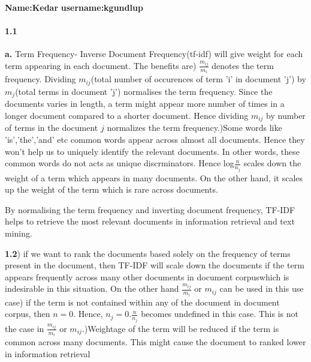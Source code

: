 \documentclass{article}
\begin{document}
\textbf{Name:Kedar}\newline
\textbf{username:kgundlup}\newline
\paragraph{1.1}
\textbf{a.}
Term Frequency- Inverse Document Frequency(tf-idf) will give weight for each term appearing in each document. The benefits are) $\frac{m_{ij}}{m_{i}}$ denotes the term frequency. Dividing $m_{ij}$(total number of occurences of term 'i' in document 'j') by $m_{j}$(total terms in document 'j') normalises the term frequency. Since the documents varies in length, a term might appear more number of times in a longer document compared to a shorter document. Hence dividing $m_{ij}$ by number of terms in the document ${j}$ normalizes the term frequency.)Some words like 'is','the','and' etc common words appear across almost all documents. Hence they won't help us to uniquely identify the relevant documents. In other words, these common words do not acts as unique discrminators. Hence log$\frac{n}{n_{j}}$ scales down the weight of a term which appears in many documents. On the other hand, it scales up the weight of the term which is rare across documents.\newline

By normalising the term frequency and inverting document frequency, TF-IDF helps to retrieve the most relevant documents in information retrieval and text mining.\newline

\textbf{1.2}) if we want to rank the documents based solely on the frequency of terms present in the document, then TF-IDF will scale down the documents if the term appears frequently across many other documents in document corpuswhich is indesirable in this situation. On the other hand $\frac{m_{ij}}{m_{i}}$ or $m_{ij}$ can be used in this use case) if the term is not contained within any of the document in document corpus, then $n=0$. Hence, $n_j=0$.$\frac{n}{n_{j}}$ becomes undefined in this case.
This is not the case in $\frac{m_{ij}}{m_{i}}$ or $m_{ij}$.)Weightage of the term will be reduced if the term is common across many documents. This might cause the document to ranked lower in information retrieval
\end{document}
